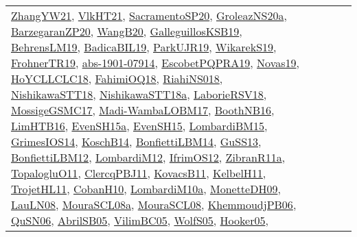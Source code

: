 {\begin{longtable}{lp{3cm}>{\raggedright}p{6cm}>{\raggedright}p{6cm}p{8cm}}
\href{articles/ZhangYW21.pdf}{ZhangYW21}\cite{ZhangYW21}, \href{articles/VlkHT21.pdf}{VlkHT21}\cite{VlkHT21}, \href{articles/SacramentoSP20.pdf}{SacramentoSP20}\cite{SacramentoSP20}, \href{papers/GroleazNS20a.pdf}{GroleazNS20a}\cite{GroleazNS20a}, \href{papers/BarzegaranZP20.pdf}{BarzegaranZP20}\cite{BarzegaranZP20}, \href{papers/WangB20.pdf}{WangB20}\cite{WangB20}, \href{papers/GalleguillosKSB19.pdf}{GalleguillosKSB19}\cite{GalleguillosKSB19}, \href{papers/BehrensLM19.pdf}{BehrensLM19}\cite{BehrensLM19}, \href{papers/BadicaBIL19.pdf}{BadicaBIL19}\cite{BadicaBIL19}, \href{papers/ParkUJR19.pdf}{ParkUJR19}\cite{ParkUJR19}, \href{articles/WikarekS19.pdf}{WikarekS19}\cite{WikarekS19}, \href{papers/FrohnerTR19.pdf}{FrohnerTR19}\cite{FrohnerTR19}, \href{articles/abs-1901-07914.pdf}{abs-1901-07914}\cite{abs-1901-07914}, \href{articles/EscobetPQPRA19.pdf}{EscobetPQPRA19}\cite{EscobetPQPRA19}, \href{articles/Novas19.pdf}{Novas19}\cite{Novas19}, \href{papers/HoYCLLCLC18.pdf}{HoYCLLCLC18}\cite{HoYCLLCLC18}, \href{articles/FahimiOQ18.pdf}{FahimiOQ18}\cite{FahimiOQ18}, \href{papers/RiahiNS018.pdf}{RiahiNS018}\cite{RiahiNS018}, \href{papers/NishikawaSTT18.pdf}{NishikawaSTT18}\cite{NishikawaSTT18}, \href{papers/NishikawaSTT18a.pdf}{NishikawaSTT18a}\cite{NishikawaSTT18a}, \href{articles/LaborieRSV18.pdf}{LaborieRSV18}\cite{LaborieRSV18}, \href{papers/MossigeGSMC17.pdf}{MossigeGSMC17}\cite{MossigeGSMC17}, \href{papers/Madi-WambaLOBM17.pdf}{Madi-WambaLOBM17}\cite{Madi-WambaLOBM17}, \href{papers/BoothNB16.pdf}{BoothNB16}\cite{BoothNB16}, \href{papers/LimHTB16.pdf}{LimHTB16}\cite{LimHTB16}, \href{articles/EvenSH15a.pdf}{EvenSH15a}\cite{EvenSH15a}, \href{papers/EvenSH15.pdf}{EvenSH15}\cite{EvenSH15}, \href{papers/LombardiBM15.pdf}{LombardiBM15}\cite{LombardiBM15}, \href{articles/GrimesIOS14.pdf}{GrimesIOS14}\cite{GrimesIOS14}, \href{papers/KoschB14.pdf}{KoschB14}\cite{KoschB14}, \href{articles/BonfiettiLBM14.pdf}{BonfiettiLBM14}\cite{BonfiettiLBM14}, \href{papers/GuSS13.pdf}{GuSS13}\cite{GuSS13}, \href{papers/BonfiettiLBM12.pdf}{BonfiettiLBM12}\cite{BonfiettiLBM12}, \href{articles/LombardiM12.pdf}{LombardiM12}\cite{LombardiM12}, \href{papers/IfrimOS12.pdf}{IfrimOS12}\cite{IfrimOS12}, \href{papers/ZibranR11a.pdf}{ZibranR11a}\cite{ZibranR11a}, \href{articles/TopalogluO11.pdf}{TopalogluO11}\cite{TopalogluO11}, \href{papers/ClercqPBJ11.pdf}{ClercqPBJ11}\cite{ClercqPBJ11}, \href{articles/KovacsB11.pdf}{KovacsB11}\cite{KovacsB11}, \href{articles/KelbelH11.pdf}{KelbelH11}\cite{KelbelH11}, \href{articles/TrojetHL11.pdf}{TrojetHL11}\cite{TrojetHL11}, \href{papers/CobanH10.pdf}{CobanH10}\cite{CobanH10}, \href{articles/LombardiM10a.pdf}{LombardiM10a}\cite{LombardiM10a}, \href{papers/MonetteDH09.pdf}{MonetteDH09}\cite{MonetteDH09}, \href{papers/LauLN08.pdf}{LauLN08}\cite{LauLN08}, \href{papers/MouraSCL08a.pdf}{MouraSCL08a}\cite{MouraSCL08a}, \href{papers/MouraSCL08.pdf}{MouraSCL08}\cite{MouraSCL08}, \href{papers/KhemmoudjPB06.pdf}{KhemmoudjPB06}\cite{KhemmoudjPB06}, \href{papers/QuSN06.pdf}{QuSN06}\cite{QuSN06}, \href{papers/AbrilSB05.pdf}{AbrilSB05}\cite{AbrilSB05}, \href{articles/VilimBC05.pdf}{VilimBC05}\cite{VilimBC05}, \href{papers/WolfS05.pdf}{WolfS05}\cite{WolfS05}, \href{articles/Hooker05.pdf}{Hooker05}\cite{Hooker05}, 
\end{longtable}}
